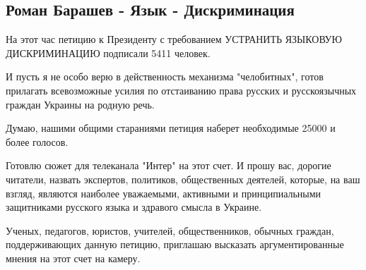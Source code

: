  
 
 

\subsection{Роман Барашев - Язык - Дискриминация}
\label{sec:09_11_2020.fb.roman_barashev.1.jazyk_discrimination}

На этот час петицию к Президенту с требованием УСТРАНИТЬ ЯЗЫКОВУЮ ДИСКРИМИНАЦИЮ
подписали 5411 человек.

И пусть я не особо верю в действенность механизма "челобитных", готов прилагать
всевозможные усилия по отстаиванию права русских и русскоязычных граждан
Украины на родную речь.

Думаю, нашими общими стараниями петиция наберет необходимые 25000 и более
голосов.

Готовлю сюжет для телеканала "Интер" на этот счет. И прошу вас, дорогие
читатели, назвать экспертов, политиков, общественных деятелей, которые, на ваш
взгляд, являются наиболее уважаемыми, активными и принципиальными защитниками
русского языка и здравого смысла в Украине. 

Ученых, педагогов, юристов, учителей, общественников, обычных граждан,
поддерживающих данную петицию, приглашаю высказать аргументированные мнения на
этот счет на камеру.

